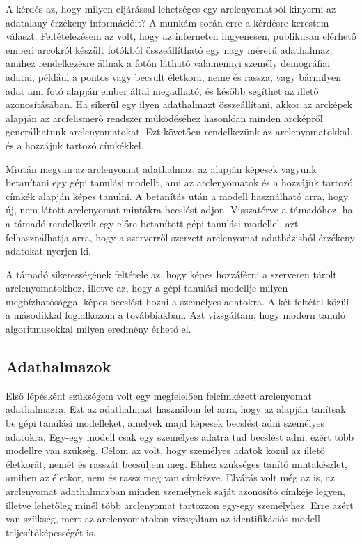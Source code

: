 A kérdés az, hogy milyen eljárással lehetséges egy arclenyomatból kinyerni az adatalany érzékeny információit? A munkám során erre a kérdésre kerestem választ. Feltételezésem az volt, hogy az interneten ingyenesen, publikusan elérhető emberi arcokról készült fotókból összeállítható egy nagy méretű adathalmaz, amihez rendelkezésre állnak a fotón látható valamennyi személy demográfiai adatai, például a pontos vagy becsült életkora, neme és rassza, vagy bármilyen adat ami fotó alapján ember által megadható, és később segíthet az illető azonosításában. Ha sikerül egy ilyen adathalmazt összeállítani, akkor az arcképek alapján az arcfelismerő rendszer működéséhez hasonlóan minden arcképről generálhatunk arclenyomatokat. Ezt követően rendelkezünk az arclenyomatokkal, és a hozzájuk tartozó címkékkel.

Miután megvan az arclenyomat adathalmaz, az alapján képesek vagyunk betanítani egy gépi tanulási modellt, ami az arclenyomatok és a hozzájuk tartozó címkék alapján képes tanulni. A betanítás után a modell használható arra, hogy új, nem látott arclenyomat mintákra becslést adjon. Visszatérve a támadóhoz, ha a támadó rendelkezik egy előre betanított gépi tanulási modellel, azt felhasználhatja arra, hogy a szerverről szerzett arclenyomat adatbázisból érzékeny adatokat nyerjen ki. 

A támadó sikerességének feltétele az, hogy képes hozzáférni a szerveren tárolt arclenyomatokhoz, illetve az, hogy a gépi tanulási modellje milyen megbízhatósággal képes becslést hozni a személyes adatokra. A két feltétel közül a másodikkal foglalkozom a továbbiakban. Azt vizsgáltam, hogy modern tanuló algoritmusokkal milyen eredmény érhető el.

\subsection{Adathalmazok} %

Első lépésként szükségem volt egy megfelelően felcímkézett arclenyomat adathalmazra. Ezt az adathalmazt használom fel arra, hogy az alapján tanítsak be gépi tanulási modelleket, amelyek majd képesek becslést adni személyes adatokra. Egy-egy modell csak egy személyes adatra tud becslést adni, ezért több modellre van szükség. Célom az volt, hogy személyes adatok közül az illető életkorát, nemét és rasszát becsüljem meg. Ehhez szükséges tanító mintakészlet, amiben az életkor, nem és rassz meg van címkézve. Elvárás volt még az is, az arclenyomat adathalmazban minden személynek saját azonosító címkéje legyen, illetve lehetőleg minél több arclenyomat tartozzon egy-egy személyhez. Erre azért van szükség, mert az arclenyomatokon vizsgáltam az identifikációs modell teljesítőképességét is. 

